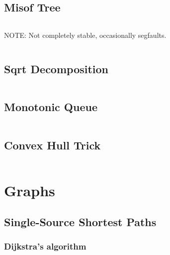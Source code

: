\documentclass[9pt,a4paper,twocolumn,landscape,oneside]{amsart}
\newcommand{\code}[1]{\inputminted{cpp}{_code/#1}}
\newif\ifverbose
\begin{document}
    \subsection{Misof Tree}
        \ifverbose
        A simple tree data structure for inserting, erasing, and querying the
        $n$th largest element.
        \fi
        \code{data-structures/misof_tree.cpp}

    \ifverbose
    \subsection{$k$-d Tree}
        \ifverbose
        A $k$-dimensional tree supporting fast construction, adding points, and
        nearest neighbor queries.
        \fi
        NOTE: Not completely stable, occasionally segfaults.
        \code{data-structures/kd_tree.cpp}
    \fi

    \subsection{Sqrt Decomposition}
        \ifverbose
        Design principle that supports many operations in amortized $\sqrt{n}$ per operation.
        \fi
        \code{data-structures/sqrt_decomposition.cpp}

    \subsection{Monotonic Queue}
        \ifverbose
        A queue that supports querying for the minimum element. Useful for sliding window algorithms.
        \fi
        \code{data-structures/monotonic_queue.cpp}

    \subsection{Convex Hull Trick}
        \code{data-structures/convex_hull_trick.cpp}

\section{Graphs}
    \subsection{Single-Source Shortest Paths}
        \subsubsection{Dijkstra's algorithm}
            \ifverbose
            An implementation of Dijkstra's algorithm. It runs in
            $\Theta(|E|\log{|V|})$ time.
            \fi
            \code{graph/dijkstra.cpp}
\end{document}

